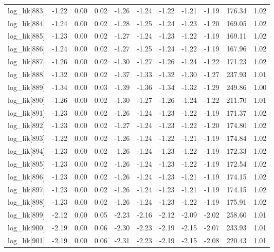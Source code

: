 \begin{table}[ht]
\begin{tabular}{rrrrrrrrrrr}
  log\_lik[883] & -1.22 & 0.00 & 0.02 & -1.26 & -1.24 & -1.22 & -1.21 & -1.19 & 176.34 & 1.02 \\ 
  log\_lik[884] & -1.24 & 0.00 & 0.02 & -1.28 & -1.25 & -1.24 & -1.23 & -1.20 & 169.05 & 1.02 \\ 
  log\_lik[885] & -1.23 & 0.00 & 0.02 & -1.27 & -1.24 & -1.23 & -1.22 & -1.19 & 169.11 & 1.02 \\ 
  log\_lik[886] & -1.24 & 0.00 & 0.02 & -1.27 & -1.25 & -1.24 & -1.22 & -1.19 & 167.96 & 1.02 \\ 
  log\_lik[887] & -1.26 & 0.00 & 0.02 & -1.30 & -1.27 & -1.26 & -1.24 & -1.22 & 171.23 & 1.02 \\ 
  log\_lik[888] & -1.32 & 0.00 & 0.02 & -1.37 & -1.33 & -1.32 & -1.30 & -1.27 & 237.93 & 1.01 \\ 
  log\_lik[889] & -1.34 & 0.00 & 0.03 & -1.39 & -1.36 & -1.34 & -1.32 & -1.29 & 249.86 & 1.00 \\ 
  log\_lik[890] & -1.26 & 0.00 & 0.02 & -1.30 & -1.27 & -1.26 & -1.24 & -1.22 & 211.70 & 1.01 \\ 
  log\_lik[891] & -1.23 & 0.00 & 0.02 & -1.26 & -1.24 & -1.23 & -1.22 & -1.19 & 171.37 & 1.02 \\ 
  log\_lik[892] & -1.23 & 0.00 & 0.02 & -1.27 & -1.24 & -1.23 & -1.22 & -1.20 & 174.80 & 1.02 \\ 
  log\_lik[893] & -1.22 & 0.00 & 0.02 & -1.26 & -1.24 & -1.22 & -1.21 & -1.19 & 174.84 & 1.02 \\ 
  log\_lik[894] & -1.23 & 0.00 & 0.02 & -1.26 & -1.24 & -1.23 & -1.22 & -1.19 & 172.33 & 1.02 \\ 
  log\_lik[895] & -1.23 & 0.00 & 0.02 & -1.26 & -1.24 & -1.23 & -1.22 & -1.19 & 172.54 & 1.02 \\ 
  log\_lik[896] & -1.23 & 0.00 & 0.02 & -1.26 & -1.24 & -1.23 & -1.21 & -1.19 & 174.15 & 1.02 \\ 
  log\_lik[897] & -1.23 & 0.00 & 0.02 & -1.26 & -1.24 & -1.23 & -1.21 & -1.19 & 174.15 & 1.02 \\ 
  log\_lik[898] & -1.23 & 0.00 & 0.02 & -1.26 & -1.24 & -1.23 & -1.22 & -1.19 & 175.91 & 1.02 \\ 
  log\_lik[899] & -2.12 & 0.00 & 0.05 & -2.23 & -2.16 & -2.12 & -2.09 & -2.02 & 258.60 & 1.01 \\ 
  log\_lik[900] & -2.19 & 0.00 & 0.06 & -2.30 & -2.23 & -2.19 & -2.15 & -2.07 & 233.93 & 1.01 \\ 
  log\_lik[901] & -2.19 & 0.00 & 0.06 & -2.31 & -2.23 & -2.19 & -2.15 & -2.08 & 220.43 & 1.01 \\ 

\end{tabular}
\end{table}
